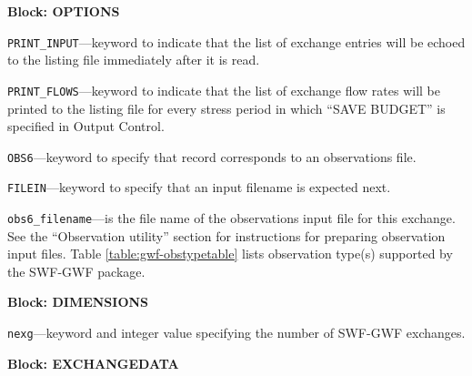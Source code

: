 
\item \textbf{Block: OPTIONS}

\begin{description}
\item \texttt{PRINT\_INPUT}---keyword to indicate that the list of exchange entries will be echoed to the listing file immediately after it is read.

\item \texttt{PRINT\_FLOWS}---keyword to indicate that the list of exchange flow rates will be printed to the listing file for every stress period in which ``SAVE BUDGET'' is specified in Output Control.

\item \texttt{OBS6}---keyword to specify that record corresponds to an observations file.

\item \texttt{FILEIN}---keyword to specify that an input filename is expected next.

\item \texttt{obs6\_filename}---is the file name of the observations input file for this exchange. See the ``Observation utility'' section for instructions for preparing observation input files. Table \ref{table:gwf-obstypetable} lists observation type(s) supported by the SWF-GWF package.

\end{description}
\item \textbf{Block: DIMENSIONS}

\begin{description}
\item \texttt{nexg}---keyword and integer value specifying the number of SWF-GWF exchanges.

\end{description}
\item \textbf{Block: EXCHANGEDATA}

